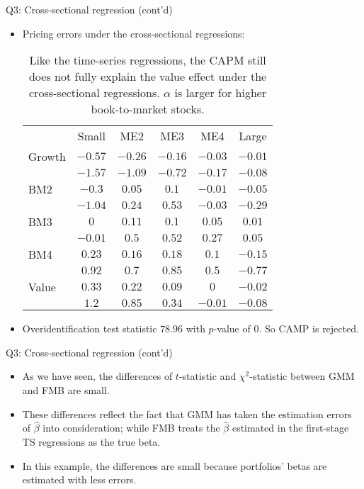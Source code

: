 \documentclass[10pt,t]{beamer}
\begin{document}
\begin{frame}{Q3: Cross-sectional regression (cont'd)}
\begin{itemize}
  \item Pricing errors under the cross-sectional regressions:
\begin{table}
\begin{tabular}{lccccc}
\toprule
 & Small & ME2 & ME3 & ME4 & Large \\
\cmidrule{1-6}
Growth & $-0.57$ & $-0.26$ & $-0.16$ & $-0.03$ & $-0.01$\\
& $-1.57$ & $-1.09$ & $-0.72$ & $-0.17$ & $-0.08$ \\
BM2 & $-0.3$ & $0.05$ & $0.1$ & $-0.01$ & $-0.05$\\
& $-1.04$ & $0.24$ & $0.53$ & $-0.03$ & $-0.29$ \\
BM3 & $0$ & $0.11$ & $0.1$ & $0.05$ & $0.01$\\
& $-0.01$ & $0.5$ & $0.52$ & $0.27$ & $0.05$ \\
BM4 & $0.23$ & $0.16$ & $0.18$ & $0.1$ & $-0.15$\\
& $0.92$ & $0.7$ & $0.85$ & $0.5$ & $-0.77$ \\
Value & $0.33$ & $0.22$ & $0.09$ & $0$ & $-0.02$\\
& $1.2$ & $0.85$ & $0.34$ & $-0.01$ & $-0.08$ \\
\bottomrule
\end{tabular}
\caption{Like the time-series regressions, the CAPM still does not fully explain the value effect under the cross-sectional regressions. $\alpha$ is larger for higher book-to-market stocks.}
\end{table}
\item Overidentification test statistic $78.96$ with $p$-value of $0$. So CAMP is rejected.
\end{itemize}
\end{frame}

\begin{frame}{Q3: Cross-sectional regression (cont'd)}
\begin{itemize}
  \item As we have seen, the differences of $t$-statistic and $\chi^2$-statistic between GMM and FMB are small.
  \item These differences reflect the fact that GMM has taken the estimation errors of $\hat{\beta}$ into consideration; while FMB treats the $\hat{\beta}$ estimated in the first-stage TS regressions as the true beta.
  \item In this example, the differences are small because portfolios' betas are estimated with less errors.
\end{itemize}
\end{frame}
\end{document}
